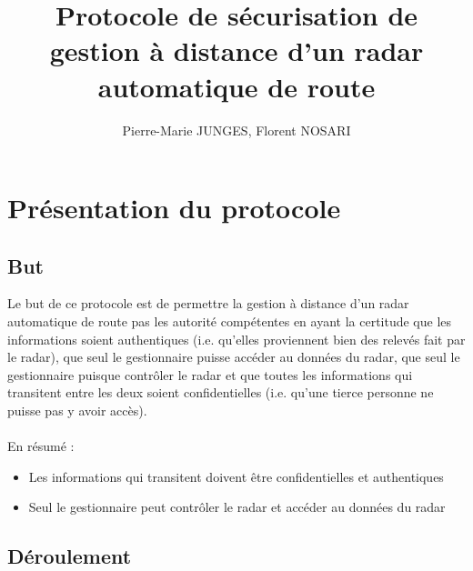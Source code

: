 \documentclass[]{scrartcl}
\title{Protocole de sécurisation de gestion à distance d'un radar automatique de route}
\author{Pierre-Marie JUNGES, Florent NOSARI}
\begin{document}
\maketitle

\begin{abstract}

\end{abstract}

\section{Présentation du protocole}

\subsection{But}

Le but de ce protocole est de permettre la gestion à distance d'un radar automatique de route pas les autorité compétentes en ayant la certitude que les informations soient authentiques (i.e. qu'elles proviennent bien des relevés fait par le radar), que seul le gestionnaire puisse accéder au données du radar, que seul le gestionnaire puisque contrôler le radar et que toutes les informations qui transitent entre les deux soient confidentielles (i.e. qu'une tierce personne ne puisse pas y avoir accès).
\\
\\
En résumé :
\\
\begin{itemize}
	\item Les informations qui transitent doivent être confidentielles et authentiques
	\item Seul le gestionnaire peut contrôler le radar et accéder au données du radar
\end{itemize}

\subsection{Déroulement}
\end{document}
